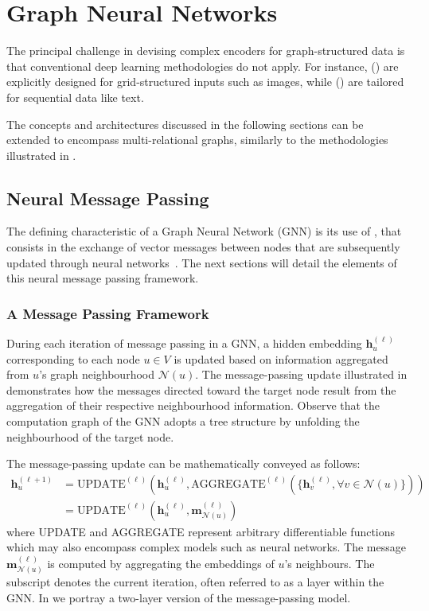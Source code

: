 \section{Graph Neural Networks}\label{sec:gnn}
The principal challenge in devising complex encoders for graph-structured data is that conventional deep learning methodologies do not apply. For instance,  () are explicitly designed for grid-structured inputs such as images, while  () are tailored for sequential data like text.

The concepts and architectures discussed in the following sections can be extended to encompass multi-relational graphs, similarly to the methodologies illustrated in .

\subsection{Neural Message Passing}
The defining characteristic of a Graph Neural Network (GNN) is its use of , that consists in the exchange of vector messages between nodes that are subsequently updated through neural networks~\cite{Gilmer2017neuralMessagePassing}. The next sections will detail the elements of this neural message passing framework.

\subsubsection{A Message Passing Framework}\label{sec:messagePassingFramework}
During each iteration of message passing in a GNN, a hidden embedding $ \mathbf{h}_u^{(\ell)} $ corresponding to each node $ u \in V $ is updated based on information aggregated from $ u $’s graph neighbourhood $ \mathcal{N}(u) $. The message-passing update illustrated in  demonstrates how the messages directed toward the target node result from the aggregation of their respective neighbourhood information. Observe that the computation graph of the GNN adopts a tree structure by unfolding the neighbourhood of the target node.



The message-passing update can be mathematically conveyed as follows:
\begin{align}\label{eq:GNNupdate}
    \mathbf{h}_u^{(\ell+1)} &= \text{UPDATE}^{(\ell)}\left(\mathbf{h}_u^{(\ell)}, \text{AGGREGATE}^{(\ell)}(\{\mathbf{h}_v^{(\ell)}, \forall v \in \mathcal{N}(u)\})\right) \\
    &= \text{UPDATE}^{(\ell)}\left(\mathbf{h}_u^{(\ell)}, \mathbf{m}_{\mathcal{N}(u)}^{(\ell)}\right)
\end{align}
where UPDATE and AGGREGATE represent arbitrary differentiable functions which may also encompass complex models such as neural networks. The message $ \mathbf{m}_{\mathcal{N}(u)}^{(\ell)} $ is computed by aggregating the embeddings of $ u $'s neighbours. The subscript denotes the current iteration, often referred to as a layer within the GNN. In  we portray a two-layer version of the message-passing model.

